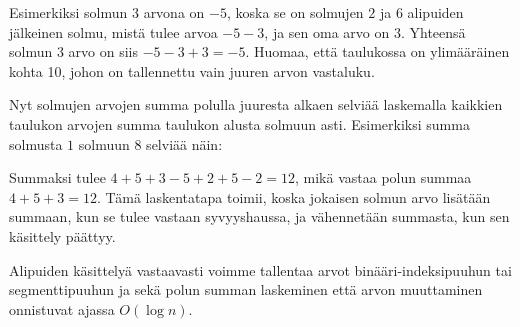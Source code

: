 Esimerkiksi solmun $3$ arvona on $-5$, koska
se on solmujen $2$ ja $6$ alipuiden jälkeinen solmu,
mistä tulee arvoa $-5-3$, ja sen oma arvo on $3$.
Yhteensä solmun 3 arvo on siis $-5-3+3=-5$.
Huomaa, että taulukossa on ylimääräinen kohta 10,
johon on tallennettu vain juuren arvon vastaluku.

Nyt solmujen arvojen summa polulla juuresta alkaen
selviää laskemalla kaikkien taulukon arvojen summa
taulukon alusta solmuun asti.
Esimerkiksi summa solmusta $1$ solmuun $8$ selviää näin:

\begin{center}
\end{center}

Summaksi tulee $4+5+3-5+2+5-2=12$, mikä vastaa
polun summaa $4+5+3=12$.
Tämä laskentatapa toimii, koska jokaisen solmun arvo
lisätään summaan, kun se tulee vastaan syvyyshaussa,
ja vähennetään summasta, kun sen käsittely päättyy.

Alipuiden käsittelyä vastaavasti voimme tallentaa
arvot binääri-indeksi\-puuhun tai segmenttipuuhun ja
sekä polun summan laskeminen että arvon muuttaminen
onnistuvat ajassa $O(\log n)$.

